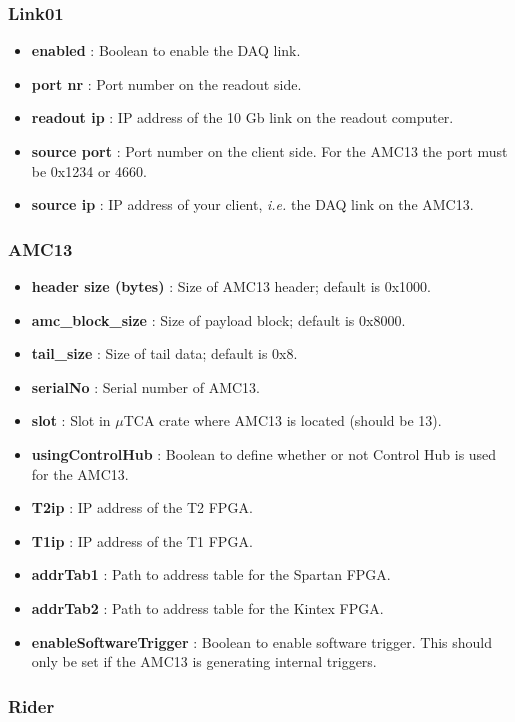 \subsubsection{Link01}

\begin{itemize}
\item {\bf enabled} : Boolean to enable the DAQ link.
\item {\bf port nr} : Port number on the readout side.
\item {\bf readout ip} : IP address of the 10 Gb link on the readout computer.
\item {\bf source port} : Port number on the client side. For the AMC13 the port must be 0x1234 or 4660. 
\item {\bf source ip} : IP address of your client, \emph{i.e.} the DAQ link on the AMC13.
\end{itemize}

\subsubsection{AMC13}

\begin{itemize}
\item {\bf header size (bytes)} : Size of AMC13 header; default is 0x1000.
\item {\bf amc\_block\_size} : Size of payload block; default is 0x8000.
\item {\bf tail\_size} : Size of tail data; default is 0x8.
\item {\bf serialNo} : Serial number of AMC13.
\item {\bf slot} : Slot in $\mu$TCA crate where AMC13 is located (should be 13).
\item {\bf usingControlHub} : Boolean to define whether or not Control Hub is used for the AMC13.
\item {\bf T2ip} : IP address of the T2 FPGA.
\item {\bf T1ip} : IP address of the T1 FPGA.
\item {\bf addrTab1} : Path to address table for the Spartan FPGA.
\item {\bf addrTab2} : Path to address table for the Kintex FPGA.
\item {\bf enableSoftwareTrigger} : Boolean to enable software trigger. This should only be set if the AMC13 is generating internal triggers. 
\end{itemize}

\subsubsection{Rider}

